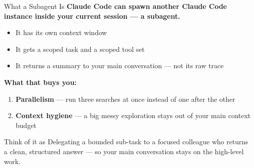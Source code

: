 \documentclass[aspectratio=169, 11pt]{beamer}
\begin{document}

\begin{frame}{What a Subagent Is}
  \textbf{Claude Code can spawn another Claude Code instance inside your current session --- a subagent.}

  \vspace{0.6em}
  \begin{itemize}
    \item It has its own context window
    \item It gets a scoped task and a scoped tool set
    \item It returns a summary to your main conversation --- not its raw trace
  \end{itemize}

  \vspace{0.8em}
  \textbf{What that buys you:}
  \begin{enumerate}
    \item \textbf{Parallelism} --- run three searches at once instead of one after the other
    \item \textbf{Context hygiene} --- a big messy exploration stays out of your main context budget
  \end{enumerate}

  \vspace{0.5em}
  \begin{block}{Think of it as}
    Delegating a bounded sub-task to a focused colleague who returns a clean, structured answer --- so your main conversation stays on the high-level work.
  \end{block}
\end{frame}
\end{document}

